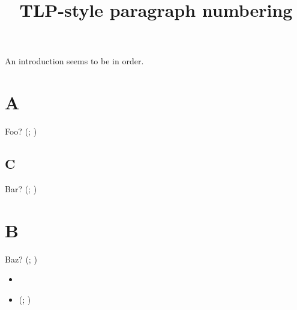 \documentclass{article}
\title{TLP-style paragraph numbering}
\newcounter{TLP}
\newcounter{TLPn}
\begin{document}
An introduction seems to be in order.

\section{A}
Foo? (\theTLP; \theTLPn)

\kant[1-2]

\subsection{C}
Bar? (\theTLP; \theTLPn)

\kant[6]

\section{B}
Baz? (\theTLP; \theTLPn)

\kant[3]

\begin{itemize}
    \item \kant[4]
    \item (\theTLP; \theTLPn) \kant[5]
\end{itemize}
\end{document}
